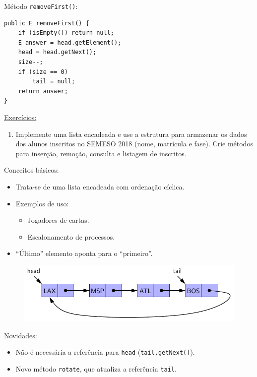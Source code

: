 \medskip

Método \texttt{removeFirst()}:
\begin{verbatim}
public E removeFirst() {
	if (isEmpty()) return null;
	E answer = head.getElement();
	head = head.getNext();
	size--;
	if (size == 0)
		tail = null;
	return answer;
}
\end{verbatim}

\clearpage

\underline{Exercícios:}
\begin{enumerate}
	\item Implemente uma lista encadeada e use a estrutura para armazenar os dados dos alunos inscritos no SEMESO 2018 (nome, matrícula e fase). Crie métodos para inserção, remoção, consulta e listagem de inscritos.
\end{enumerate}

\bigskip


Conceitos básicos:
\begin{itemize}
	\item Trata-se de uma lista encadeada com ordenação cíclica.
	\item Exemplos de uso:
	\begin{itemize}
		\item Jogadores de cartas.
		\item Escalonamento de processos.
	\end{itemize}
	\item ``Último'' elemento aponta para o ``primeiro''.
\end{itemize}

\begin{figure}[H]
	\centering
	\includegraphics[width=0.7\linewidth]{img/figure-3-16}
\end{figure}

Novidades:
\begin{itemize}
	\item Não é necessária a referência para \texttt{head} (\texttt{tail.getNext()}).
	\item Novo método \texttt{rotate}, que atualiza a referência \texttt{tail}.
\end{itemize}

